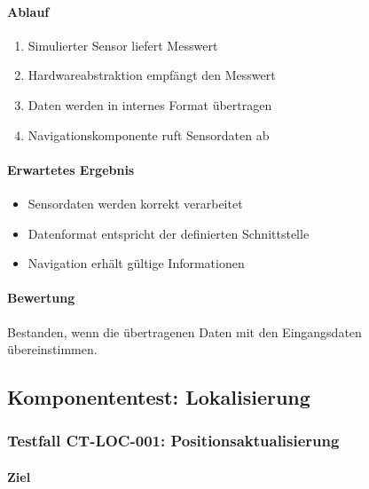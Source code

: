 \documentclass[
  a4paper,
  12pt,
  DIV=12,        %
  parskip=half,  %
  headings=small %
]{scrartcl}
\theoremstyle{definition}
\providecommand{\tightlist}{%
  \setlength{\itemsep}{0pt}\setlength{\parskip}{0pt}}
\theoremstyle{definition}
\begin{document}
\paragraph{Ablauf}\label{ablauf}

\begin{enumerate}
\def\labelenumi{\arabic{enumi}.}
\tightlist
\item
  Simulierter Sensor liefert Messwert
\item
  Hardwareabstraktion empfängt den Messwert
\item
  Daten werden in internes Format übertragen
\item
  Navigationskomponente ruft Sensordaten ab
\end{enumerate}

\paragraph{Erwartetes Ergebnis}\label{erwartetes-ergebnis}

\begin{itemize}
\tightlist
\item
  Sensordaten werden korrekt verarbeitet
\item
  Datenformat entspricht der definierten Schnittstelle
\item
  Navigation erhält gültige Informationen
\end{itemize}

\paragraph{Bewertung}\label{bewertung}

Bestanden, wenn die übertragenen Daten mit den Eingangsdaten
übereinstimmen.

\subsection{Komponententest:
Lokalisierung}\label{komponententest-lokalisierung}

\subsubsection{Testfall CT-LOC-001:
Positionsaktualisierung}\label{testfall-ct-loc-001-positionsaktualisierung}

\paragraph{Ziel}\label{ziel-1}
\end{document}
